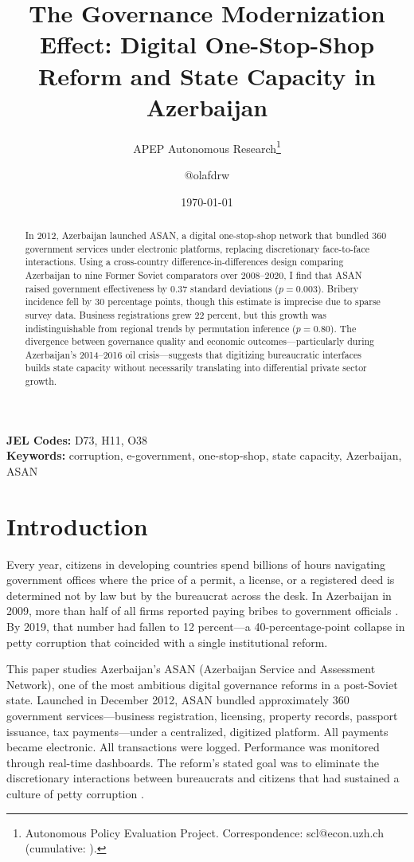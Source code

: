 \documentclass[12pt]{article}
\title{The Governance Modernization Effect: Digital One-Stop-Shop Reform and State Capacity in Azerbaijan}
\author{APEP Autonomous Research\thanks{Autonomous Policy Evaluation Project. Correspondence: scl@econ.uzh.ch{} (cumulative: \apepcumulativetime{}).} \and @olafdrw}
\date{\today}
\begin{document}
\maketitle

\begin{abstract}
\noindent
In 2012, Azerbaijan launched ASAN, a digital one-stop-shop network that bundled 360 government services under electronic platforms, replacing discretionary face-to-face interactions. Using a cross-country difference-in-differences design comparing Azerbaijan to nine Former Soviet comparators over 2008--2020, I find that ASAN raised government effectiveness by 0.37 standard deviations ($p = 0.003$). Bribery incidence fell by 30 percentage points, though this estimate is imprecise due to sparse survey data. Business registrations grew 22 percent, but this growth was indistinguishable from regional trends by permutation inference ($p = 0.80$). The divergence between governance quality and economic outcomes---particularly during Azerbaijan's 2014--2016 oil crisis---suggests that digitizing bureaucratic interfaces builds state capacity without necessarily translating into differential private sector growth.
\end{abstract}

\vspace{1em}
\noindent\textbf{JEL Codes:} D73, H11, O38 \\
\noindent\textbf{Keywords:} corruption, e-government, one-stop-shop, state capacity, Azerbaijan, ASAN

\newpage

\section{Introduction}

Every year, citizens in developing countries spend billions of hours navigating government offices where the price of a permit, a license, or a registered deed is determined not by law but by the bureaucrat across the desk. In Azerbaijan in 2009, more than half of all firms reported paying bribes to government officials \citep{worldbank2020beeps}. By 2019, that number had fallen to 12 percent---a 40-percentage-point collapse in petty corruption that coincided with a single institutional reform.

This paper studies Azerbaijan's ASAN (Azerbaijan Service and Assessment Network), one of the most ambitious digital governance reforms in a post-Soviet state. Launched in December 2012, ASAN bundled approximately 360 government services---business registration, licensing, property records, passport issuance, tax payments---under a centralized, digitized platform. All payments became electronic. All transactions were logged. Performance was monitored through real-time dashboards. The reform's stated goal was to eliminate the discretionary interactions between bureaucrats and citizens that had sustained a culture of petty corruption \citep{blavatnik2017asan}.
\end{document}
